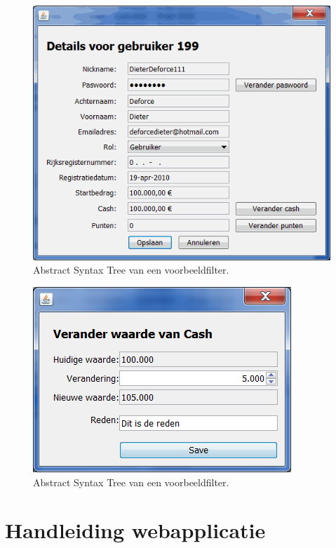 \begin{figure}[h!]
	\centering
		\includegraphics[width=\textwidth]{images/handleiding/handleiding3.png}
	\caption{Abstract Syntax Tree van een voorbeeldfilter.}
\end{figure}

\begin{figure}[h!]
	\centering
		\includegraphics[width=\textwidth]{images/handleiding/handleiding2.png}
	\caption{Abstract Syntax Tree van een voorbeeldfilter.}
\end{figure}

\chapter{Handleiding webapplicatie}

